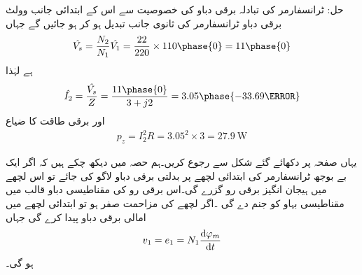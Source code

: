 حل:
	ٹرانسفارمر کی تبادلہ برقی دباو کی خصوصیت سے اس کے ابتدائی جانب  وولٹ برقی دباو ٹرانسفارمر کی ثانوی جانب تبدیل ہو کر   ہو جائیں گے جہاں
\begin{align*}
\hat{V_s}=\frac{N_2}{N_1} \hat{V_1}=\frac{22}{220} \times 110\phase{0}=11\phase{0}
\end{align*}
ہے لہٰذا
\begin{align*}
\hat{I_2}=\frac{\hat{V_s}}{Z}=\frac{11\phase{0}}{3+j 2}= 3.05\phase{-33.69\degree}
\end{align*}
اور برقی طاقت کا ضیاع 
\begin{align*}
p_z=I_2^2 R=3.05^2 \times 3=\SI{27.9}{\watt}
\end{align*}

یہاں صفحہ  پر دکھائے گئے  شکل   سے رجوع کریں۔ہم حصہ   میں دیکھ چکے ہیں کہ اگر ایک بے بوجھ ٹرانسفارمر کی ابتدائی لچھے پر بدلتی برقی دباو  لاگو کی جائے تو اس لچھے میں ہیجان انگیز برقی رو  گزرے گی۔اس برقی رو کی مقناطیسی دباو  قالب میں مقناطیسی بہاو  کو جنم دے گی ۔اگر لچھے کی مزاحمت صفر ہو تو  ابتدائی لچھے میں  امالی برقی دباو پیدا کرے گی جہاں
\begin{align}\label{مساوات_ٹرانسفارمر_دباو_برابر_بہاو_تفرق}
v_1=e_1=N_1 \frac{\dif \varphi_m}{\dif t}
\end{align}
ہو گی۔

